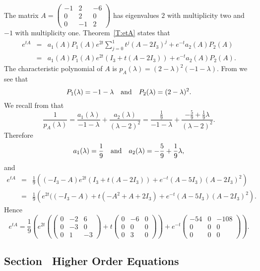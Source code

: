 \soln The matrix 
$A = \left(\begin{array}{rrr} -1 & 2 & -6\\ 0 & 2 & 0 \\ 0 & -1 & 2
\end{array}\right)$ has eigenvalues $2$ with multiplicity two and $-1$ 
with multiplicity one. Theorem~\ref{T:etA} states that 
\begin{eqnarray*}
e^{tA} & = & a_1(A)P_1(A)e^{2t}\sum_{j=0}^1t^j(A-2I_3)^j+e^{-t}a_2(A)P_2(A)\\
 & = & a_1(A)P_1(A)e^{2t}(I_3+t(A-2I_3)) + e^{-t}a_2(A)P_2(A).
\end{eqnarray*}
The characteristic polynomial of $A$ is 
$p_A(\lambda) =(2-\lambda)^2(-1-\lambda)$.  From  we see that
\[
P_1(\lambda) = -1-\lambda \quad\mbox{and}\quad P_2(\lambda) = (2-\lambda)^2.
\]
We recall from  that 
\[
\frac{1}{p_A(\lambda)} = \frac{a_1(\lambda)}{-1-\lambda} + 
\frac{a_2(\lambda)}{(\lambda-2)^2} = \frac{\frac{1}{9}}{-1-\lambda}
+ \frac{-\frac{5}{9}+\frac{1}{9}\lambda}{(\lambda-2)^2}.
\]
Therefore
\[
a_1(\lambda) = \frac{1}{9} \quad\mbox{and}\quad a_2(\lambda) = -\frac{5}{9}+\frac{1}{9}\lambda,
\]
and
\begin{eqnarray*}
e^{tA} & = & \frac{1}{9}\left((-I_3-A)e^{2t}(I_3+t(A-2I_3)) + 
e^{-t}(A-5I_3)(A-2I_3)^2\right)\\
& = & 
\frac{1}{9}\left(e^{2t}((-I_3-A)+t(-A^2+A+2I_3)+e^{-t}(A-5I_3)(A-2I_3)^2\right).
\end{eqnarray*}
Hence
\[
e^{tA}= \frac{1}{9}\left(e^{2t}\left(\left(\begin{array}{rrr} 0 & -2 & 6\\ 
0 & -3 & 0\\ 0 & 1 & -3\end{array}\right)+t\left(\begin{array}{rrr} 0& -6 & 0\\ 
0 & 0 & 0\\ 0 & 3 & 0 \end{array}\right)\right)+e^{-t}\left(\begin{array}{rrr} 
-54 & 0 & -108\\ 0 & 0 & 0 \\ 0 & 0 & 0\end{array}\right)\right).
\]



\subsection*{Section~\protect{\ref{sec:HighOrder}} Higher Order Equations}


